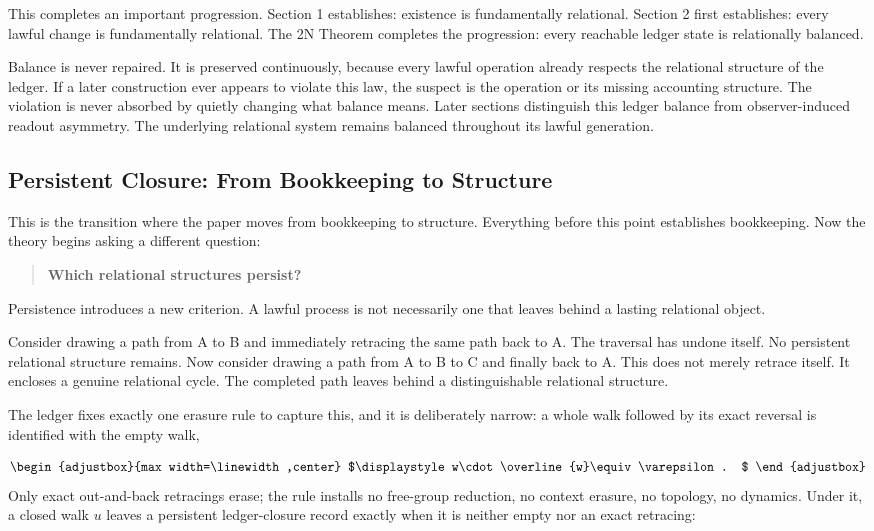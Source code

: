 This completes an important progression. Section 1 establishes: existence is fundamentally relational. Section 2 first establishes: every lawful change is fundamentally relational. The 2N Theorem completes the progression: every reachable ledger state is relationally balanced.

Balance is never repaired. It is preserved continuously, because every lawful operation already respects the relational structure of the ledger. If a later construction ever appears to violate this law, the suspect is the operation or its missing accounting structure. The violation is never absorbed by quietly changing what balance means. Later sections distinguish this ledger balance from observer-induced readout asymmetry. The underlying relational system remains balanced throughout its lawful generation.

\subsection{Persistent Closure: From Bookkeeping to Structure}
This is the transition where the paper moves from bookkeeping to structure. Everything before this point establishes bookkeeping. Now the theory begins asking a different question:

\begin{quote}
\textbf{Which relational structures persist?}
\end{quote}
Persistence introduces a new criterion. A lawful process is not necessarily one that leaves behind a lasting relational object.

Consider drawing a path from A to B and immediately retracing the same path back to A. The traversal has undone itself. No persistent relational structure remains. Now consider drawing a path from A to B to C and finally back to A. This does not merely retrace itself. It encloses a genuine relational cycle. The completed path leaves behind a distinguishable relational structure.

The ledger fixes exactly one erasure rule to capture this, and it is deliberately narrow: a whole walk followed by its exact reversal is identified with the empty walk,

\begin{equation*}
\begin{adjustbox}{max width=\linewidth,center}
$\displaystyle
w\cdot \overline{w}\equiv \varepsilon .
$
\end{adjustbox}
\end{equation*}
Only exact out-and-back retracings erase; the rule installs no free-group reduction, no context erasure, no topology, no dynamics. Under it, a closed walk \(u\) leaves a persistent ledger-closure record exactly when it is neither empty nor an exact retracing:

